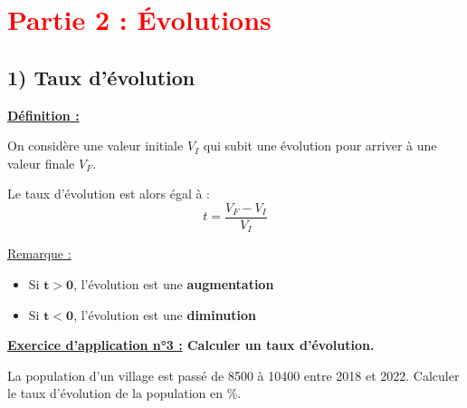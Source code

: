 \documentclass[12pt]{article}
\begin{document}
\vspace{20pt}

\section*{\textcolor{red}{Partie 2 : Évolutions}}

\subsection*{\hspace{1cm} 1) Taux d'évolution}

\begin{mdframed}[
    linewidth=1pt,
    linecolor=ForestGreen,
    innertopmargin=10pt,
    innerbottommargin=10pt
]
{\color{ForestGreen}\textbf{\underline{Définition :}}}  

On considère une valeur initiale $V_I$ qui subit une évolution pour arriver à une valeur finale $V_F$.

Le taux d'évolution est alors égal à :
\[
t = \dfrac{V_F-V_I}{V_I}
\]

\end{mdframed}

\underline{Remarque :}
\begin{itemize}
    \item Si $\bm{t>0}$, l'évolution est une \textbf{augmentation}
    \item Si $\bm{t<0}$, l'évolution est une \textbf{diminution}
\end{itemize}

\begin{mdframed}[
    linewidth=1pt,
    linecolor=RoyalBlue,
    innertopmargin=10pt,
    innerbottommargin=10pt
]
{\color{RoyalBlue}\textbf{\underline{Exercice d'application n°3 :}
Calculer un taux d'évolution.}}

\vspace{5pt}
La population d'un village est passé de 8500 à 10400 entre 2018 et 2022.
Calculer le taux d'évolution de la population en \%.

\vspace{0.5cm}
{\color{black!30}\dotfill}

\vspace{0.5cm}
{\color{black!30}\dotfill}

\vspace{0.5cm}
{\color{black!30}\dotfill}

\vspace{0.5cm}
{\color{black!30}\dotfill}

\end{mdframed}
\end{document}
